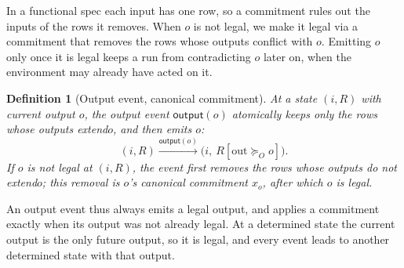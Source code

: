 \documentclass[sigconf]{cidr-2027}
\newtheorem{definition}{Definition}
\theoremstyle{remark}
\newcommand{\OutputGe}{\succeq_O}
\newcommand{\commitment}{commitment\xspace}
\newcommand{\outrelbase}{extend\xspace}       %
\begin{document}
In a functional spec each input has one row, so a \commitment rules out the
inputs of the rows it removes.  When $o$ is not legal, we make it legal via a \commitment
that removes the rows whose outputs conflict with $o$.  Emitting $o$ only once it is legal keeps a run from
contradicting $o$ later on, when the environment may already have acted on it.

\begin{definition}[Output event, canonical \commitment]
\label{def:output-event}
At a state $(i,R)$ with current output $o$, the \emph{output event}
$\mathsf{output}(o)$ atomically keeps only the rows whose outputs \outrelbase $o$,
and then emits $o$:
\begin{equation}
  (i,R)\xrightarrow{\mathsf{output}(o)}\bigl(i,\ R[\mathrm{out}\OutputGe o]\bigr).
  \label{eq:output-action}
\end{equation}
If $o$ is not legal at $(i,R)$, the event first removes the rows whose outputs
do not \outrelbase $o$; this removal is $o$'s \emph{canonical \commitment} $x_o$,
after which $o$ is legal.
\end{definition}

An output event thus always emits a legal output, and applies a \commitment
exactly when its output was not already legal.  At a determined state the
current output is the only future output, so it is legal, and every event
leads to another determined state with that output.
\end{document}
